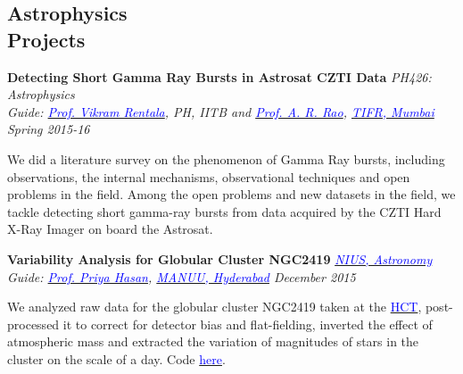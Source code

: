 \documentclass[margin,line]{res}
\newenvironment{list1}{
  \begin{list}{\ding{113}}{%
      \setlength{\itemsep}{0in}
      \setlength{\parsep}{0in} \setlength{\parskip}{0in}
      \setlength{\topsep}{0in} \setlength{\partopsep}{0in} 
      \setlength{\leftmargin}{0.17in}}}{\end{list}}
\begin{document}
\begin{resume}
\section{\sc Astrophysics \\Projects}
{\bf Detecting Short Gamma Ray Bursts in Astrosat CZTI Data} \hfill \textit{PH426: Astrophysics} \\
{\em Guide: \href{https://sites.google.com/site/vikramrentalahome/}{\textcolor{blue}{Prof. Vikram Rentala}}, \textit{PH, IITB} and \href{http://web.tifr.res.in/~arrao/}{\textcolor{blue}{Prof. A. R. Rao}}, \href{http://www.tifr.res.in/}{\textcolor{blue} {TIFR, Mumbai}} \hfill Spring 2015-16} \\
\vspace*{-.15in}
\begin{list1}
\item[] We did a literature survey on the phenomenon of Gamma Ray bursts, including observations, the internal mechanisms, observational techniques and open problems in the field. Among the open problems and new datasets in the field, we tackle detecting short gamma-ray bursts from data acquired by the CZTI Hard X-Ray Imager on board the Astrosat.
\end{list1}

\vspace*{-0.1in}

{\bf Variability Analysis for Globular Cluster NGC2419} \hfill \textit{\href{http://nius.hbcse.tifr.res.in/}{\textcolor{blue} {NIUS, Astronomy}}} \\
{\em Guide: \href{http://http://manuu.ac.in/deptphysc_faclty.php/}{\textcolor{blue}{Prof. Priya Hasan}}, \href{http://manuu.ac.in/}{\textcolor{blue} {MANUU, Hyderabad}} \hfill December 2015} \\
\vspace*{-.15in}
\begin{list1}
\item[] We analyzed raw data for the globular cluster NGC2419 taken at the \href{http://www.iiap.res.in/iao/cycle.html}{\textcolor{blue} {HCT}}, post-processed it to correct for detector bias and flat-fielding, inverted the effect of atmospheric mass and extracted the variation of magnitudes of stars in the cluster on the scale of a day. Code \href{https://github.com/alankarkotwal/ngc2419-variables}{\textcolor{blue} {here}}.
\end{list1}

\vspace*{-0.1in}


\end{resume}
\end{document}
